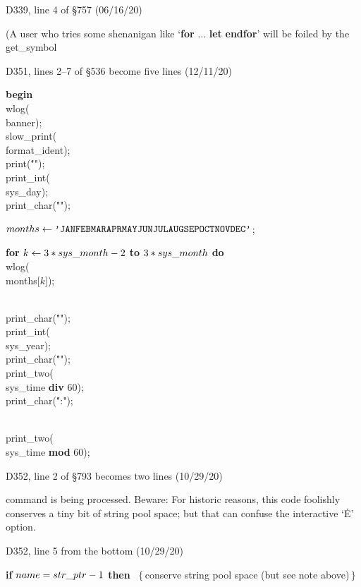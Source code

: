 \bugonpage D339, line 4 of \S757 (06/16/20)

\tenpoint\noindent\quad
(A user who tries some shenanigan like `{\bf for} $\ldots$ {\bf let} {\bf endfor}'
will be foiled by the \\{get\_symbol}\cutpar

\bugonpage D351, lines 2--7 of \S536 become five lines (12/11/20)

\ninepoint\noindent\quad
{\bf begin} \\{wlog}(\\{banner});
\\{slow\_print}(\\{format\_ident});
\\{print}(\.{"\]\]"});
\\{print\_int}(\\{sys\_day});
\\{print\_char}(\.{"\]"});\par
\noindent\quad
$\\{months}\gets\.{\char`\'JANFEBMARAPRMAYJUNJULAUGSEPOCTNOVDEC\char`\'}$;\par
\noindent\quad
{\bf for} $k\gets3\ast\\{sys\_month}-2$ {\bf to} $3\ast\\{sys\_month}$
{\bf do} \\{wlog}(\\{months}[$k$]);\par
\noindent\quad
\\{print\_char}(\.{"\]"});
\\{print\_int}(\\{sys\_year});
\\{print\_char}(\.{"\]"});
\\{print\_two}(\\{sys\_time} {\bf div} 60);
\\{print\_char}(\.{":"});\par
\noindent\quad
\\{print\_two}(\\{sys\_time} {\bf mod} 60);

\bugonpage D352, line 2 of \S793 becomes two lines (10/29/20)

\tenpoint\noindent
command is being processed.
Beware: For historic reasons, this code foolishly conserves a tiny bit
of string pool space; but that can confuse the interactive `\.E' option.

\bugonpage D352, line 5 from the bottom (10/29/20)

\ninepoint\noindent
{\bf if} $\\{name}=\\{str\_ptr}-1$ {\bf then}
\ $\{\,$conserve string pool space (but see note above)$\,\}$


